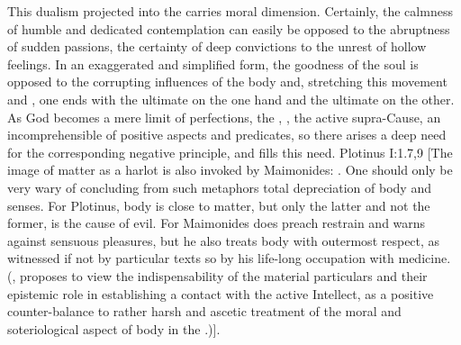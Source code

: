 \pa
This dualism projected into the  carries moral dimension.
Certainly, the calmness of humble and dedicated contemplation can easily be
opposed to the abruptness of sudden passions, the certainty of deep convictions
to the unrest of hollow feelings. In an exaggerated and simplified form, the
goodness of the soul is opposed to the corrupting influences of the body and,
stretching this movement  and , one ends with the
ultimate  on the one hand and the ultimate  on the other.
As God becomes a mere limit of perfections, the ,
, the active supra-Cause, an incomprehensible
 of positive aspects and predicates, so there arises a deep need
for the corresponding negative principle, and  fills this need.
\citet{As necessarily as there is Something after the First, so necessarily
  there is a Last: this Last is Matter, the thing which has no residue of good
  in it: here is the necessity of Evil. [...] Matter becomes mistress of what is
  manifested through it: it corrupts and destroys the incomer}{Plotinus}{
  I:1.7,9 [The image of matter as a harlot is also invoked by Maimonides:
  . One should only be very wary of
  concluding from such metaphors total depreciation of body and senses. For
  Plotinus, body is close to matter, but only the latter and not the former, is
  the cause of evil. For  Maimonides does
  preach restrain and warns against sensuous pleasures, but he also treats body
  with outermost respect, as witnessed if not by particular texts so by his
  life-long occupation with medicine.  (\citeauthor*{MaimonMatter}, proposes to
  view the indispensability of the material particulars and their epistemic role
  in establishing a contact with the active Intellect, as a positive
  counter-balance to rather harsh and ascetic treatment of the moral and
  soteriological aspect of body in the .)]}.
